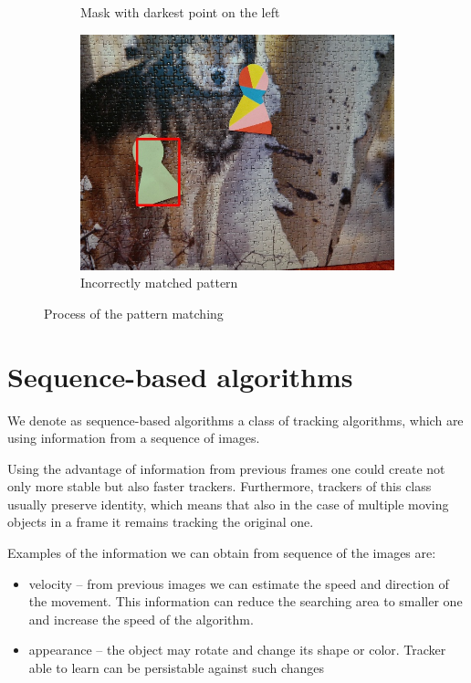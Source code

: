 \begin{figure}
\begin{subfigure}{0.48\linewidth}
    \caption{Mask with darkest point on the left}
  \end{subfigure}
  \begin{subfigure}{0.48\linewidth}
    \includegraphics[width=\linewidth]{img/pattern_matching/result-incorrect.jpg}
    \caption{Incorrectly matched pattern}
  \end{subfigure}
  \caption{Process of the pattern matching}
  \label{fig:pattern-matching-tracker}
\end{figure}


\section{Sequence-based algorithms}

We denote as sequence-based algorithms a class of tracking algorithms, which
are using information from a sequence of images.

Using the advantage of information from previous frames one could create not only
more stable but also faster trackers. Furthermore, trackers of this class usually preserve identity, which means
that also in the case of multiple moving objects in a frame it remains tracking the original
one.

Examples of the information we can obtain from sequence of the images are:
\begin{itemize}
\item velocity -- from previous images we can estimate the speed and direction of
  the movement. This information can reduce the searching area to smaller one
  and increase the speed of the algorithm.
\item appearance -- the object may rotate and change its shape or color. Tracker able to
  learn can be persistable against such changes
\end{itemize}

